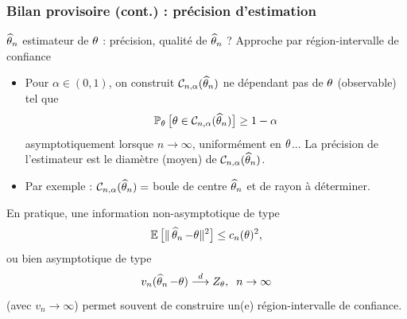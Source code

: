 \begin{frame}
\frametitle{Bilan provisoire (cont.) : précision d'estimation}
$\operatorname{\widehat \theta_{\mathnormal{n}}}$ estimateur de $\theta$ : \alert{précision, qualité} de  $\operatorname{\widehat \theta_{\mathnormal{n}}}$ ?
Approche par \alert{région-intervalle de confiance}
\begin{itemize}
\item Pour $\alpha \in (0,1)$, on construit ${\mathcal C}_{n,\alpha}(\operatorname{\widehat \theta_{\mathnormal{n}}})$ \alert{ ne dépendant pas de $\theta$} (observable)
tel que
$$\operatorname{{\mathbb P}}_\theta \big[\theta \in {\mathcal C}_{n,\alpha}(\operatorname{\widehat \theta_{\mathnormal{n}}})\big] \geq 1-\alpha$$
asymptotiquement lorsque $n\rightarrow \infty$, uniformément en $\theta$...
La \alert{précision} de l'estimateur est le \alert{ diamètre} (moyen) de ${\mathcal C}_{n,\alpha}(\operatorname{\widehat \theta_{\mathnormal{n}}})$.
\item Par exemple : ${\mathcal C}_{n,\alpha}(\operatorname{\widehat \theta_{\mathnormal{n}}}) =$ boule de centre $\operatorname{\widehat \theta_{\mathnormal{n}}}$ et de rayon \alert{à déterminer}.
\end{itemize}
\end{frame}

\begin{frame}
En pratique, une information \alert{ non-asymptotique} de type
$$\operatorname{{\mathbb E}}\big[\|\operatorname{\widehat \theta_{\mathnormal{n}}}-\theta\|^2\big] \leq c_n(\theta)^2,$$
ou bien \alert{ asymptotique} de type
$$v_n(\operatorname{\widehat \theta_{\mathnormal{n}}}-\theta) \stackrel{d}{\longrightarrow} Z_\theta,\;\;n\rightarrow \infty$$
(avec $v_n\rightarrow \infty$) permet \og souvent\fg{} de construire
un(e) région-intervalle de confiance.
\end{frame}









